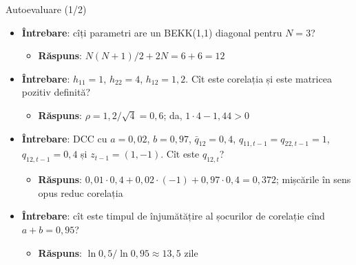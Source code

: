 \begin{frame}{Autoevaluare (1/2)}
\itemsize{\footnotesize}
\begin{itemize}
    \item \textbf{Întrebare}: cîți parametri are un BEKK(1,1) diagonal pentru $N = 3$?
    \begin{itemize}
        \item \textbf{Răspuns}: $N(N+1)/2 + 2N = 6 + 6 = 12$
    \end{itemize}
    \item \textbf{Întrebare}: $h_{11} = 1$, $h_{22} = 4$, $h_{12} = 1{,}2$. Cît este corelația și este matricea pozitiv definită?
    \begin{itemize}
        \item \textbf{Răspuns}: $\rho = 1{,}2/\sqrt{4} = 0{,}6$; da, $1 \cdot 4 - 1{,}44 > 0$
    \end{itemize}
    \item \textbf{Întrebare}: DCC cu $a = 0{,}02$, $b = 0{,}97$, $\bar q_{12} = 0{,}4$, $q_{11,t-1} = q_{22,t-1} = 1$, $q_{12,t-1} = 0{,}4$ și $z_{t-1} = (1, -1)$. Cît este $q_{12,t}$?
    \begin{itemize}
        \item \textbf{Răspuns}: $0{,}01 \cdot 0{,}4 + 0{,}02 \cdot (-1) + 0{,}97 \cdot 0{,}4 = 0{,}372$; mișcările în sens opus reduc corelația
    \end{itemize}
    \item \textbf{Întrebare}: cît este timpul de înjumătățire al șocurilor de corelație cînd $a + b = 0{,}95$?
    \begin{itemize}
        \item \textbf{Răspuns}: $\ln 0{,}5/\ln 0{,}95 \approx 13{,}5$ zile
    \end{itemize}
\end{itemize}
\end{frame}

